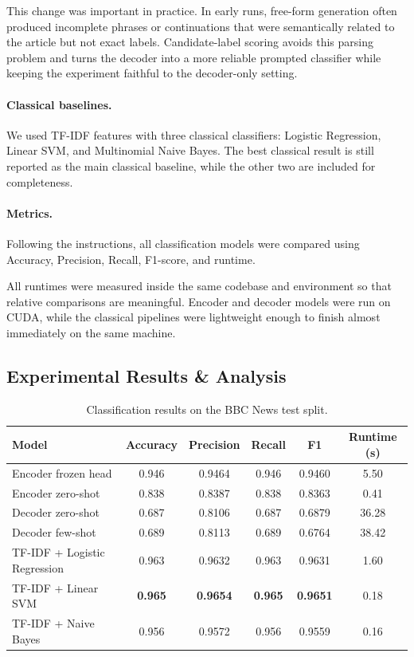 \documentclass{article}
\begin{document}
This change was important in practice. In early runs, free-form generation often produced incomplete phrases or continuations that were semantically related to the article but not exact labels. Candidate-label scoring avoids this parsing problem and turns the decoder into a more reliable prompted classifier while keeping the experiment faithful to the decoder-only setting.

\paragraph{Classical baselines.}
We used TF-IDF features with three classical classifiers: Logistic Regression, Linear SVM, and Multinomial Naive Bayes. The best classical result is still reported as the main classical baseline, while the other two are included for completeness.

\paragraph{Metrics.}
Following the instructions, all classification models were compared using Accuracy, Precision, Recall, F1-score, and runtime.

All runtimes were measured inside the same codebase and environment so that relative comparisons are meaningful. Encoder and decoder models were run on CUDA, while the classical pipelines were lightweight enough to finish almost immediately on the same machine.

\subsection{Experimental Results \& Analysis}

\begin{table}[H]
\centering
\small
\caption{Classification results on the BBC News test split.}
\label{tab:classification}
\begin{tabular}{lccccc}
\toprule
Model & Accuracy & Precision & Recall & F1 & Runtime (s) \\
\midrule
Encoder frozen head & 0.946 & 0.9464 & 0.946 & 0.9460 & 5.50 \\
Encoder zero-shot & 0.838 & 0.8387 & 0.838 & 0.8363 & 0.41 \\
Decoder zero-shot & 0.687 & 0.8106 & 0.687 & 0.6879 & 36.28 \\
Decoder few-shot & 0.689 & 0.8113 & 0.689 & 0.6764 & 38.42 \\
TF-IDF + Logistic Regression & 0.963 & 0.9632 & 0.963 & 0.9631 & 1.60 \\
TF-IDF + Linear SVM & \textbf{0.965} & \textbf{0.9654} & \textbf{0.965} & \textbf{0.9651} & 0.18 \\
TF-IDF + Naive Bayes & 0.956 & 0.9572 & 0.956 & 0.9559 & 0.16 \\
\bottomrule
\end{tabular}
\end{table}
\end{document}
